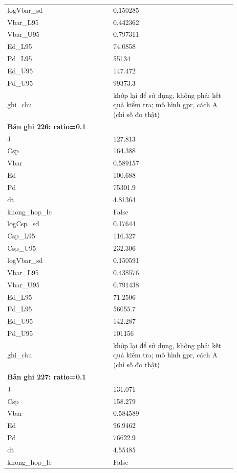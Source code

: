 \begin{longtable}{p{0.43\linewidth}p{0.50\linewidth}}
logVbar\_\allowbreak sd & 0.150285 \\
Vbar\_\allowbreak L95 & 0.442362 \\
Vbar\_\allowbreak U95 & 0.797311 \\
Ed\_\allowbreak L95 & 74.0858 \\
Pd\_\allowbreak L95 & 55134 \\
Ed\_\allowbreak U95 & 147.472 \\
Pd\_\allowbreak U95 & 99373.3 \\
ghi\_\allowbreak chu & khớp lại để sử dụng, không phải kết quả kiểm tra; mô hình gpr, cách A (chỉ số đo thật) \\
\midrule
\multicolumn{2}{p{0.95\linewidth}}{\textbf{Bản ghi 226: ratio=0.1}} \\
J & 127.813 \\
Csp & 164.388 \\
Vbar & 0.589157 \\
Ed & 100.688 \\
Pd & 75301.9 \\
dt & 4.81364 \\
khong\_\allowbreak hop\_\allowbreak le & False \\
logCsp\_\allowbreak sd & 0.17644 \\
Csp\_\allowbreak L95 & 116.327 \\
Csp\_\allowbreak U95 & 232.306 \\
logVbar\_\allowbreak sd & 0.150591 \\
Vbar\_\allowbreak L95 & 0.438576 \\
Vbar\_\allowbreak U95 & 0.791438 \\
Ed\_\allowbreak L95 & 71.2506 \\
Pd\_\allowbreak L95 & 56055.7 \\
Ed\_\allowbreak U95 & 142.287 \\
Pd\_\allowbreak U95 & 101156 \\
ghi\_\allowbreak chu & khớp lại để sử dụng, không phải kết quả kiểm tra; mô hình gpr, cách A (chỉ số đo thật) \\
\midrule
\multicolumn{2}{p{0.95\linewidth}}{\textbf{Bản ghi 227: ratio=0.1}} \\
J & 131.071 \\
Csp & 158.279 \\
Vbar & 0.584589 \\
Ed & 96.9462 \\
Pd & 76622.9 \\
dt & 4.55485 \\
khong\_\allowbreak hop\_\allowbreak le & False \\

\end{longtable}
